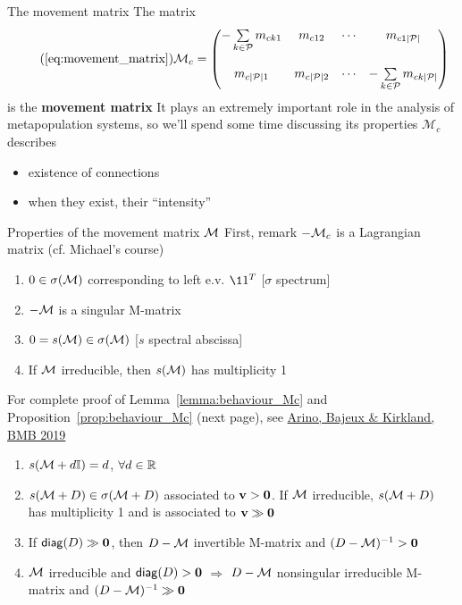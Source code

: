 \documentclass[aspectratio=43]{beamer}
\begin{document}
\begin{frame}{The movement matrix}
	The matrix
	\begin{equation}\tag{\ref{eq:movement_matrix}}
		\mathcal{M}_c =
		\begin{pmatrix}
		-\sum\limits_{k\in\P}m_{ck1} & m_{c12} & \cdots & m_{c1|\P|} \\
		& & & \\
		m_{c|\P|1} & m_{c|\P|2} & \cdots & -\sum\limits_{k\in\P}m_{ck|\P|}
		\end{pmatrix}
	\end{equation}
	is the \textbf{movement matrix}
	\vfill
	It plays an extremely important role in the analysis of metapopulation systems, so we'll spend some time discussing its properties
	\vfill
$\mathcal{M}_c$ describes
\begin{itemize} 
\item existence of connections
\item when they exist, their ``intensity''
\end{itemize}
\end{frame}

\begin{frame}{Properties of the movement matrix $\mathcal{M}$}
	First, remark $-\mathcal{M}_c$ is a Lagrangian matrix (cf. Michael's course)
	\vfill
	\begin{lemma}\label{lemma:behaviour_Mc}
		\begin{enumerate}
			\item $0\in\sigma(\mathcal{M})$ corresponding to left e.v. $\11^T$ \hfill[$\sigma$ spectrum]
			\item $-\mathcal{M}$ is a singular M-matrix
			\item $0=s(\mathcal{M})\in\sigma(\mathcal{M})$ \hfill[$s$ spectral abscissa]
			\item If $\mathcal{M}$ irreducible, then $s(\mathcal{M})$ has multiplicity 1
		\end{enumerate}
	\end{lemma}
	\vfill
	For complete proof of Lemma~\ref{lemma:behaviour_Mc} and Proposition~\ref{prop:behaviour_Mc} (next page), see \href{http://dx.doi.org/10.1007/s11538-019-00593-1}{Arino, Bajeux \& Kirkland, BMB 2019}
\end{frame}

\begin{frame}
	\begin{proposition}
		\label{prop:behaviour_Mc}
		\begin{enumerate}
			\item $s(\mathcal{M}+d\mathbb{I})=d$, $\forall d\in\mathbb{R}$
			\item $s(\mathcal{M}+D)\in\sigma(\mathcal{M}+D)$ associated to $\bv>\b0$. If $\mathcal{M}$ irreducible, $s(\mathcal{M}+D)$ has  multiplicity 1 and is associated to $\bv\gg \b0$
			\item If $\diag (D)\gg \b0$, then $D-\mathcal{M}$ invertible M-matrix and $(D-\M)^{-1}> \b0$
			\item $\mathcal{M}$ irreducible and $\diag(D)>\b0$ $\Longrightarrow$ $D-\mathcal{M}$ nonsingular irreducible M-matrix and $(D-\M)^{-1}\gg \b0$		
		\end{enumerate}
	\end{proposition}
\end{frame}
\end{document}
